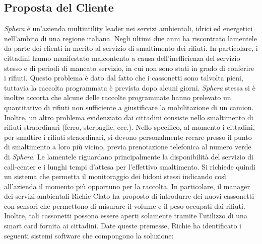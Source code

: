 \subsection{Proposta del Cliente}
\textit{Sphera} è un'azienda multiutility leader nei servizi ambientali, idrici ed energetici nell'ambito di una regione italiana.
Negli ultimi due anni ha riscontrato lamentele da parte dei clienti in merito al servizio di smaltimento dei rifiuti.
In particolare, i cittadini hanno manifestato malcontento a causa dell'inefficienza del servizio stesso e di periodi di
mancato servizio, in cui non sono stati in grado di conferire i rifiuti.
Questo problema è dato dal fatto che i cassonetti sono talvolta pieni, tuttavia la raccolta programmata è prevista dopo alcuni giorni.
\textit{Sphera} stessa si è inoltre accorta che alcune delle raccolte programmate hanno prelevato un quantitativo di rifiuti non sufficiente a giustificare la mobilitazione di un camion.
Inoltre, un altro problema evidenziato dai cittadini consiste nello smaltimento di rifiuti straordinari (ferro, sterpaglie, ecc.).
Nello specifico, al momento i cittadini, per smaltire i rifiuti straordinari, si devono personalmente recare presso il punto di smaltimento a loro più vicino, previa prenotazione telefonica al numero verde di \textit{Sphera}.
Le lamentele riguardano principalmente la disponibilità del servizio di call-center e i lunghi tempi d'attesa per l'effettivo smaltimento.
Si richiede quindi un sistema che permetta il monitoraggio dei bidoni stessi indicando così all'azienda il momento più opportuno per la raccolta.
In particolare, il manager dei servizi ambientali Richie Clato ha proposto di introdurre dei nuovi cassonetti con sensori che permettono di misurare il volume e il peso occupati dai rifiuti.
Inoltre, tali cassonetti possono essere aperti solamente tramite l'utilizzo di una smart card fornita ai cittadini.
Date queste premesse, Richie ha identificato i seguenti sistemi software che compongono la soluzione:
